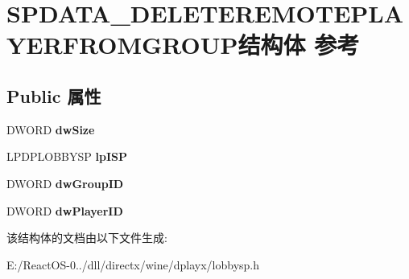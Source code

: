\hypertarget{struct_s_p_d_a_t_a___d_e_l_e_t_e_r_e_m_o_t_e_p_l_a_y_e_r_f_r_o_m_g_r_o_u_p}{}\section{S\+P\+D\+A\+T\+A\+\_\+\+D\+E\+L\+E\+T\+E\+R\+E\+M\+O\+T\+E\+P\+L\+A\+Y\+E\+R\+F\+R\+O\+M\+G\+R\+O\+U\+P结构体 参考}
\label{struct_s_p_d_a_t_a___d_e_l_e_t_e_r_e_m_o_t_e_p_l_a_y_e_r_f_r_o_m_g_r_o_u_p}
\subsection*{Public 属性}
\begin{DoxyCompactItemize}
\item 
\mbox{\label{struct_s_p_d_a_t_a___d_e_l_e_t_e_r_e_m_o_t_e_p_l_a_y_e_r_f_r_o_m_g_r_o_u_p_a9192fe7ca7643dc4db01a0b5f6197bdc}} 
D\+W\+O\+RD {\bfseries dw\+Size}
\item 
\mbox{\label{struct_s_p_d_a_t_a___d_e_l_e_t_e_r_e_m_o_t_e_p_l_a_y_e_r_f_r_o_m_g_r_o_u_p_ab79f3eb7d5d75704816281d7962802c4}} 
L\+P\+D\+P\+L\+O\+B\+B\+Y\+SP {\bfseries lp\+I\+SP}
\item 
\mbox{\label{struct_s_p_d_a_t_a___d_e_l_e_t_e_r_e_m_o_t_e_p_l_a_y_e_r_f_r_o_m_g_r_o_u_p_abfbdc5e0624fdf1cfe1d9182b5b623db}} 
D\+W\+O\+RD {\bfseries dw\+Group\+ID}
\item 
\mbox{\label{struct_s_p_d_a_t_a___d_e_l_e_t_e_r_e_m_o_t_e_p_l_a_y_e_r_f_r_o_m_g_r_o_u_p_a32838d58005b305cf6d35432ca23bad0}} 
D\+W\+O\+RD {\bfseries dw\+Player\+ID}
\end{DoxyCompactItemize}


该结构体的文档由以下文件生成\+:\begin{DoxyCompactItemize}
\item 
E\+:/\+React\+O\+S-\/0../dll/directx/wine/dplayx/lobbysp.\+h\end{DoxyCompactItemize}
